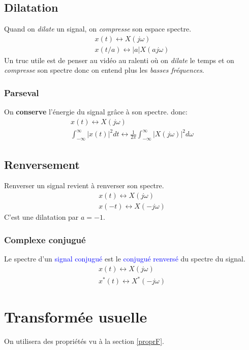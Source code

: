 \documentclass{report}
\begin{document}
\subsection{Dilatation}
Quand on \textit{dilate} un signal, on \textit{compresse} son espace spectre.
\begin{align*}
x(t) \longleftrightarrow X(j\omega)\\
x(t/a) \longleftrightarrow |a|X(aj\omega)
\end{align*}
Un truc utile est de penser au vidéo au ralenti où on \textit{dilate} le temps et on \textit{compresse} son spectre donc on entend plus les \textit{basses fréquences}.

\subsubsection{Parseval}
On \textbf{conserve} l'énergie du signal grâce à son spectre. donc:
\begin{align*}
x(t) \longleftrightarrow X(j\omega)\\
\int_{-\infty}^{\infty} |x(t)|^2 dt \longleftrightarrow \frac{1}{2\pi} \int_{-\infty}^{\infty} |X(j\omega)|^2 d\omega
\end{align*}

\subsection{Renversement}
Renverser un signal revient à renverser son spectre.
\begin{align}
x(t) \longleftrightarrow X(j\omega)\\
x(-t) \longleftrightarrow X(-j\omega)
\end{align}
C'est une dilatation par $a = -1$.
\subsubsection{Complexe conjugué}
Le spectre d'un \textcolor{blue}{signal conjugué} est le \textcolor{blue}{conjugué renversé} du spectre du signal.
\begin{align*}
x(t) \longleftrightarrow X(j\omega)\\
x^*(t) \longleftrightarrow X^*(-j\omega)
\end{align*}


\section{Transformée usuelle}
On utilisera des propriétés vu à la section \ref{proprF}.
\end{document}
